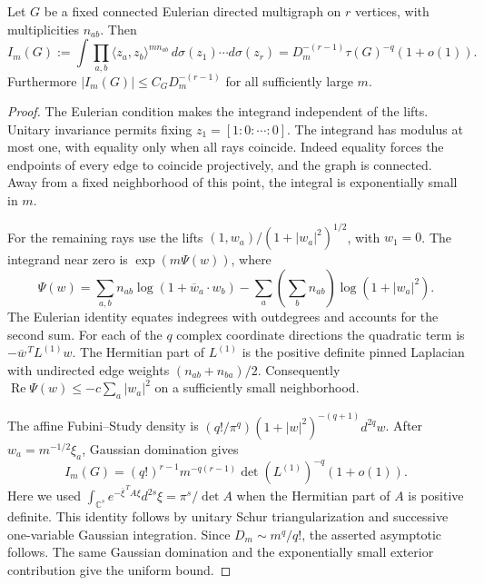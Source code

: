 \begin{lemma}
\label{lem:coherent-graph-integral}
Let $G$ be a fixed connected Eulerian directed multigraph on $r$
vertices, with multiplicities $n_{ab}$.  Then
\begin{equation}
 I_m(G):=\int\prod_{a,b}\langle z_a,z_b\rangle^{m n_{ab}}
                   \,d\sigma(z_1)\cdots d\sigma(z_r)
 =D_m^{-(r-1)}\tau(G)^{-q}(1+o(1)).
 \label{eq:coherent-graph-integral}
\end{equation}
Furthermore $|I_m(G)|\leq C_GD_m^{-(r-1)}$ for all sufficiently
large $m$.
\end{lemma}

\begin{proof}
The Eulerian condition makes the integrand independent of the lifts.
Unitary invariance permits fixing $z_1=[1:0:\cdots:0]$.  The
integrand has modulus at most one, with equality only when all rays
coincide.  Indeed equality forces the endpoints of every edge to
coincide projectively, and the graph is connected.  Away from a
fixed neighborhood of this point, the integral is exponentially
small in $m$.

For the remaining rays use the lifts
$(1,w_a)/(1+|w_a|^2)^{1/2}$, with $w_1=0$.  The integrand near
zero is $\exp(m\Psi(w))$, where
\[
 \Psi(w)=\sum_{a,b}n_{ab}\log(1+\overline w_a\cdot w_b)
       -\sum_a\left(\sum_b n_{ab}\right)\log(1+|w_a|^2).
\]
The Eulerian identity equates indegrees with outdegrees and accounts
for the second sum.  For each of the $q$ complex coordinate
directions the quadratic term is $-\overline w^{\,T}L^{(1)}w$.
The Hermitian part of $L^{(1)}$ is the positive definite pinned
Laplacian with undirected edge weights $(n_{ab}+n_{ba})/2$.
Consequently $\operatorname{Re}\Psi(w)\leq-c\sum_a|w_a|^2$
on a sufficiently small neighborhood.

The affine Fubini--Study density is
$(q!/\pi^q)(1+|w|^2)^{-(q+1)}d^{2q}w$.
After $w_a=m^{-1/2}\xi_a$, Gaussian domination gives
\[
 I_m(G)=(q!)^{r-1}m^{-q(r-1)}\det(L^{(1)})^{-q}(1+o(1)).
\]
Here we used
$\int_{\mathbb C^s}e^{-\overline\xi^{\,T}A\xi}d^{2s}\xi
=\pi^s/\det A$ when the Hermitian part of $A$ is positive
definite.  This identity follows by unitary Schur triangularization
and successive one-variable Gaussian integration.  Since
$D_m\sim m^q/q!$, the asserted asymptotic follows.  The same
Gaussian domination and the exponentially small exterior contribution
give the uniform bound.
\end{proof}

